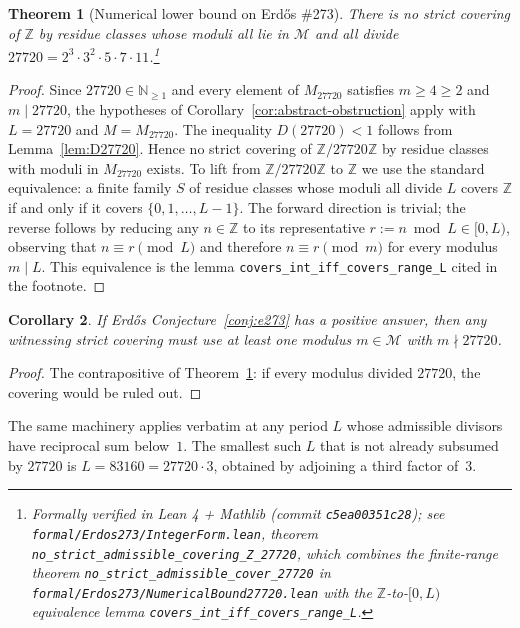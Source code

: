 \documentclass[11pt,a4paper]{article}
\theoremstyle{plain}
\newtheorem{theorem}{Theorem}
\newtheorem{corollary}[theorem]{Corollary}
\theoremstyle{definition}
\theoremstyle{remark}
\begin{document}
\begin{theorem}[Numerical lower bound on Erdős \#273]
\label{thm:numerical-27720}
There is no strict covering of\/ $\mathbb{Z}$ by residue classes
whose moduli all lie in $\mathcal{M}$ and all divide $27720 = 2^3
\cdot 3^2 \cdot 5 \cdot 7 \cdot 11$.\footnote{Formally verified in
Lean 4 + Mathlib (commit \texttt{c5ea00351c28}); see
\texttt{formal/Erdos273/IntegerForm.lean}, theorem
\texttt{no\_strict\_admissible\_covering\_Z\_27720}, which combines
the finite-range theorem \texttt{no\_strict\_admissible\_cover\_27720}
in \texttt{formal/Erdos273/NumericalBound27720.lean} with the
$\mathbb{Z}$-to-$[0, L)$ equivalence lemma
\texttt{covers\_int\_iff\_covers\_range\_L}.}
\end{theorem}
\begin{proof}
Since $27720 \in \mathbb{N}_{\geq 1}$ and every element of
$M_{27720}$ satisfies $m \geq 4 \geq 2$ and $m \mid 27720$, the
hypotheses of Corollary~\ref{cor:abstract-obstruction} apply with
$L = 27720$ and $M = M_{27720}$. The inequality $D(27720) < 1$
follows from Lemma~\ref{lem:D27720}. Hence no strict covering of
$\mathbb{Z}/27720\mathbb{Z}$ by residue classes with moduli in
$M_{27720}$ exists. To lift from $\mathbb{Z}/27720\mathbb{Z}$ to
$\mathbb{Z}$ we use the standard equivalence: a finite family $S$
of residue classes whose moduli all divide $L$ covers $\mathbb{Z}$
if and only if it covers $\{0, 1, \ldots, L - 1\}$. The forward
direction is trivial; the reverse follows by reducing any
$n \in \mathbb{Z}$ to its representative
$r := n \bmod L \in [0, L)$, observing that $n \equiv r \pmod L$
and therefore $n \equiv r \pmod{m}$ for every modulus $m \mid L$.
This equivalence is the lemma
\texttt{covers\_int\_iff\_covers\_range\_L} cited in the footnote.
\end{proof}

\begin{corollary}\label{cor:lcm-lower-bound}
If Erdős Conjecture~\ref{conj:e273} has a positive answer, then any
witnessing strict covering must use at least one modulus
$m \in \mathcal{M}$ with $m \nmid 27720$.
\end{corollary}
\begin{proof}
The contrapositive of Theorem~\ref{thm:numerical-27720}: if every
modulus divided $27720$, the covering would be ruled out.
\end{proof}

The same machinery applies verbatim at any period $L$ whose
admissible divisors have reciprocal sum below~$1$. The smallest such
$L$ that is not already subsumed by $27720$ is $L = 83160 = 27720
\cdot 3$, obtained by adjoining a third factor of~$3$.
\end{document}
